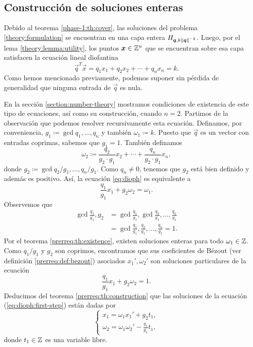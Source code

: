 \subsection{Construcción de soluciones enteras}
\label{subsec:dioph-eq}
\noindent
Debido al teorema \ref{phase-1:th:cover}, las soluciones del problema \eqref{theory:formulation} se
encuentran en una capa entera $H_{\boldsymbol{q}, k\left\lVert \boldsymbol{q} \right\rVert^{-2}}$. Luego, por el lema \ref{theory:lemma:utility}, los
puntos $\boldsymbol{x} \in \mathbb{Z}^n$ que se encuentran sobre esa capa satisfacen la ecuación lineal diofantina
\begin{equation}
	\label{eq:dioph}
	\vec{q}^T\vec{x} = q_1x_1 + q_2x_2 + \cdots + q_nx_n = k.
\end{equation}
Como hemos mencionado previamente, podemos suponer sin pérdida de generalidad que ninguna entrada
de $\vec{q}$ es nula.

En la sección \ref{section:number-theory} mostramos condiciones de existencia
de este tipo de ecuaciones, así como su construcción, cuando $n = 2$. Partimos de la
observación que podemos resolver recursivamente esta ecuación. Definamos, por conveniencia, $g_1
\coloneq \gcd{q_1, \ldots, q_n}$ y también $\omega_1 \coloneq k$. Puesto que $\vec{q}$ es un vector
con entradas coprimas, sabemos que $g_1 = 1$. También definamos
\begin{equation}
	\label{def:dummy:omega-2}
	\omega_2 \coloneq \frac{q_2}{g_2 \cdot g_1}x_2 + \cdots + \frac{q_n}{g_2 \cdot
	g_1}x_n,
\end{equation}
donde $g_2 \coloneq \gcd{q_2/g_1, \ldots, q_n/g_1}$. Como $q_n \neq 0$, tenemos que $g_2$ está bien
definido y además es positivo. Así, la ecuación \eqref{eq:dioph} es equivalente a
\begin{equation}
	\label{eq:dioph:first-step}
	\frac{q_1}{g_1}x_1 + g_2\omega_2 = \omega_1.
\end{equation}
Observemos que
\begin{align*}
	\gcd{\frac{q_1}{g_1}, g_2}
	&= \gcd{\frac{q_1}{g_1}, \gcd{\frac{q_2}{g_1}, \ldots, \frac{q_n}{g_1}}} \\
	&= \gcd{\frac{q_1}{g_1}, \frac{q_2}{g_1}, \ldots, \frac{q_n}{g_1}} = 1.
\end{align*}
Por el teorema \ref{prerreq:th:existence}, existen soluciones enteras para todo $\omega_1 \in \mathbb{Z}$.
Como $q_1/g_1$ y $g_2$ son coprimos, encontramos que sus coeficientes de Bézout (ver definición
\ref{prerreq:def:bezout}) asociados $x_1', \omega_2'$ son soluciones particulares de la ecuación
\begin{equation*}
	\frac{q_1}{g_1}x_1 + g_2\omega_2 = 1.
\end{equation*}
Deducimos del teorema \ref{prerreq:th:construction} que las soluciones de la ecuación
(\ref{eq:dioph:first-step}) están dadas por
\begin{equation}
	\label{dummy:eq:first-step}
	\begin{cases}
		x_1 = \omega_1x_1' + g_2t_1, \\
		\omega_2 = \omega_1\omega_2' - \frac{q_1}{g_1}t_1,
	\end{cases}
\end{equation}
donde $t_1 \in \mathbb{Z}$ es una variable libre.

